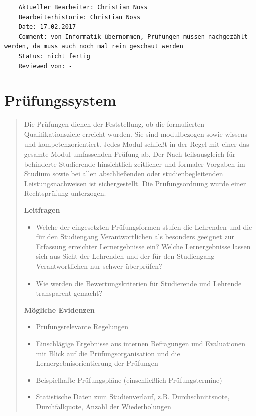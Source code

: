 \begin{verbatim}
    Aktueller Bearbeiter: Christian Noss
    Bearbeiterhistorie: Christian Noss
    Date: 17.02.2017
    Comment: von Informatik übernommen, Prüfungen müssen nachgezählt werden, da muss auch noch mal rein geschaut werden
    Status: nicht fertig
    Reviewed von: -
\end{verbatim}

\chapter{Prüfungssystem}\label{pruxfcfungssystem}

\begin{quote}
Die Prüfungen dienen der Feststellung, ob die formulierten
Qualifikationsziele erreicht wurden. Sie sind modulbezogen sowie
wissens- und kompetenzorientiert. Jedes Modul schließt in der Regel mit
einer das gesamte Modul umfassenden Prüfung ab. Der Nach-teilsausgleich
für behinderte Studierende hinsichtlich zeitlicher und formaler Vorgaben
im Studium sowie bei allen abschließenden oder studienbegleitenden
Leistungsnachweisen ist sichergestellt. Die Prüfungsordnung wurde einer
Rechtsprüfung unterzogen.

\textbf{Leitfragen}

\begin{itemize}
\item
  Welche der eingesetzten Prüfungsformen stufen die Lehrenden und die
  für den Studiengang Verantwortlichen als besonders geeignet zur
  Erfassung erreichter Lernergebnisse ein? Welche Lernergebnisse lassen
  sich aus Sicht der Lehrenden und der für den Studiengang
  Verantwortlichen nur schwer überprüfen?
\item
  Wie werden die Bewertungskriterien für Studierende und Lehrende
  transparent gemacht?
\end{itemize}

\textbf{Mögliche Evidenzen}

\begin{itemize}
\item
  Prüfungsrelevante Regelungen
\item
  Einschlägige Ergebnisse aus internen Befragungen und Evaluationen mit
  Blick auf die Prüfungsorganisation und die Lernergebnisorientierung
  der Prüfungen
\item
  Beispielhafte Prüfungspläne (einschließlich Prüfungstermine)
\item
  Statistische Daten zum Studienverlauf, z.B. Durchschnittsnote,
  Durchfallquote, Anzahl der Wiederholungen
\end{itemize}
\end{quote}


